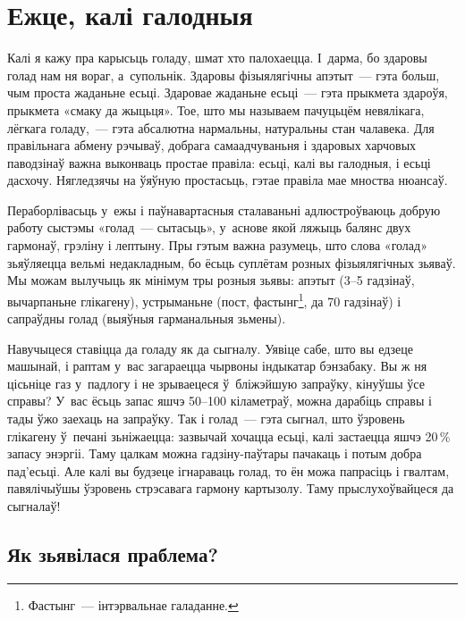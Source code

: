 \chapter{Ежце, калі галодныя}

Калі я кажу пра карысьць голаду, шмат хто палохаецца. І~дарма, бо здаровы голад нам ня вораг, а~супольнік. Здаровы фізыялягічны апэтыт~--- гэта больш, чым проста жаданьне есьці. Здаровае жаданьне есьці~--- гэта прыкмета здароўя, прыкмета «смаку да жыцьця». Тое, што мы называем пачуцьцём невялікага, лёгкага голаду,~--- гэта абсалютна нармальны, натуральны стан чалавека. Для правільнага абмену рэчываў, добрага самаадчуваньня і здаровых харчовых паводзінаў важна выконваць простае правіла: есьці, калі вы галодныя, і есьці дасхочу. Нягледзячы на ўяўную простасьць, гэтае правіла мае мноства нюансаў.

Пераборлівасьць у~ежы і паўнавартасныя сталаваньні адлюстроўваюць добрую работу сыстэмы «голад~--- сытасьць», у~аснове якой ляжыць балянс двух гармонаў, грэліну і лептыну. Пры гэтым важна разумець, што слова «голад» зьяўляецца вельмі недакладным, бо ёсьць суплётам розных фізыялягічных зьяваў. Мы можам вылучыць як мінімум тры розныя зьявы: апэтыт (3--5 гадзінаў, вычарпаньне глікагену), устрыманьне (пост, фастынг\footnote{Фастынг~--- інтэрвальнае галаданне.}, да 70 гадзінаў) і сапраўдны голад (выяўныя гарманальныя зьмены).


Навучыцеся ставіцца да голаду як да сыгналу. Уявіце сабе, што вы едзеце машынай, і раптам у~вас загараецца чырвоны індыкатар бэнзабаку. Вы ж ня цісьніце газ у~падлогу і не зрываецеся ў~бліжэйшую запраўку, кінуўшы ўсе справы? У~вас ёсьць запас яшчэ 50--100 кіламетраў, можна дарабіць справы і тады ўжо заехаць на запраўку. Так і голад~--- гэта сыгнал, што ўзровень глікагену ў~печані зьніжаецца: зазвычай хочацца есьці, калі застаецца яшчэ 20\,\% запасу энэргіі. Таму цалкам можна гадзіну-паўтары пачакаць і потым добра пад'есьці. Але калі вы будзеце ігнараваць голад, то ён можа папрасіць і гвалтам, павялічыўшы ўзровень стрэсавага гармону картызолу. Таму прыслухоўвайцеся да сыгналаў!

\section{Як зьявілася праблема?}

